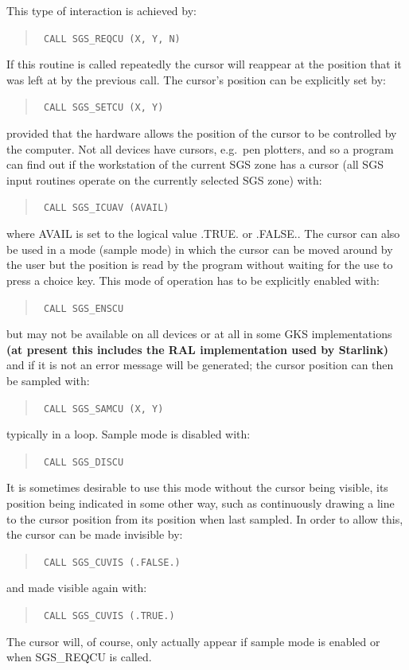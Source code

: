 \documentclass[11pt]{article}
\newcommand{\htmlref}[2]{#1}
\begin{document}
This type of interaction is achieved by:
\begin{quote}{\tt
    CALL \htmlref{SGS\_REQCU}{SGS_REQCU} (X, Y, N)}
\end{quote}
If
this routine is called repeatedly the cursor will reappear at the position
that it was left at by the previous call.  The
cursor's position can be explicitly
set by:
\begin{quote}{\tt
    CALL \htmlref{SGS\_SETCU}{SGS_SETCU} (X, Y)}
\end{quote}
provided that the hardware allows the position of the cursor to be controlled
by the computer.  Not all devices have cursors, e.g.\ pen plotters, and so a 
program can find out if the workstation
of the current SGS zone has a cursor (all SGS 
input routines operate on the currently selected SGS
zone) with:
\begin{quote}{\tt
    CALL \htmlref{SGS\_ICUAV}{SGS_ICUAV} (AVAIL)}
\end{quote}
where AVAIL is set to the logical value .TRUE.
or .FALSE..  The cursor can also 
be used in a mode (sample mode) in which the cursor can be moved around by the 
user but the position is read by the program without waiting for the use to
press a choice key.  This mode of operation has to be explicitly enabled with:
\begin{quote}{\tt
    CALL \htmlref{SGS\_ENSCU}{SGS_ENSCU}}
\end{quote}
but may not be available on all devices or at all in some GKS 
implementations {\bf (at present this
includes the RAL implementation used by Starlink)} and if it is not 
an error message will be generated;  the cursor position can 
then be sampled with:
\begin{quote}{\tt
    CALL \htmlref{SGS\_SAMCU}{SGS_SAMCU} (X, Y)}
\end{quote}
typically in a loop.  Sample mode is disabled with:
\begin{quote}{\tt
    CALL \htmlref{SGS\_DISCU}{SGS_DISCU}}
\end{quote}
It is sometimes desirable to use this mode without the cursor being visible,
its position being indicated in some other way, such as continuously drawing a 
line to the cursor position from its position when last
sampled.  In order to 
allow this, the cursor can be made invisible by:
\begin{quote}{\tt
    CALL \htmlref{SGS\_CUVIS}{SGS_CUVIS} (.FALSE.)}
\end{quote}
and made visible again with:
\begin{quote}{\tt
    CALL SGS\_CUVIS (.TRUE.)}
\end{quote}
The cursor will, of course,
only actually appear if sample mode is enabled or
when SGS\_REQCU is called.
\end{document}
